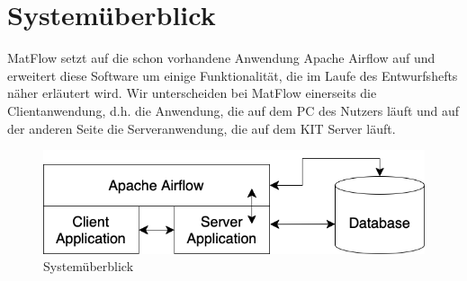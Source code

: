 \section{Systemüberblick}
MatFlow setzt auf die schon vorhandene Anwendung Apache Airflow auf und erweitert diese Software um einige Funktionalität,
die im Laufe des Entwurfshefts näher erläutert wird. Wir unterscheiden bei MatFlow einerseits die Clientanwendung, d.h. 
die Anwendung, die auf dem PC des Nutzers läuft und auf der anderen Seite die Serveranwendung, die auf dem KIT Server
läuft.
\vspace{10mm}
\begin{figure}[h]
    \includegraphics[width=1\textwidth]{res/Systemueberblick.png} 
    \caption{Systemüberblick}
\end{figure}
\newpage